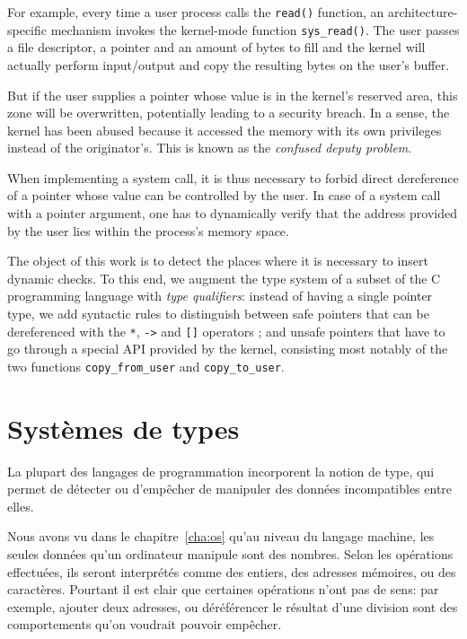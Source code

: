 For example, every time a user process calls the \texttt{read()} function, an
architecture-specific mechanism invokes the kernel-mode function
\texttt{sys\_read()}. The user passes a file descriptor, a pointer and an amount
of bytes to fill and the kernel will actually perform input/output and copy the
resulting bytes on the user's buffer.

But if the user supplies a pointer whose value is in the kernel's reserved area,
this zone will be overwritten, potentially leading to a security breach. In a
sense, the kernel has been abused because it accessed the memory with its own
privileges instead of the originator's. This is known as the \emph{confused
deputy problem}\cite{hardy88confused}.

When implementing a system call, it is thus necessary to forbid direct
dereference of a pointer whose value can be controlled by the user. In case of a
system call with a pointer argument, one has to dynamically verify that the
address provided by the user lies within the process's memory space.


The object of this work is to detect the places where it is necessary to insert
dynamic checks. To this end, we augment the type system of a subset of the C
programming language with \emph{type qualifiers}: instead of having a single
pointer type, we add syntactic rules to distinguish between safe pointers that
can be dereferenced with the \texttt{*}, \texttt{->} and \texttt{[]} operators ;
and unsafe pointers that have to go through a special API provided by the
kernel, consisting most notably of the two functions \texttt{copy\_from\_user}
and \texttt{copy\_to\_user}.

\section{Systèmes de types}

La plupart des langages de programmation incorporent la notion de type, qui
permet de détecter ou d'empêcher de manipuler des données incompatibles entre
elles.

Nous avons vu dans le chapitre~\ref{cha:os} qu'au niveau du langage machine, les
seules données qu'un ordinateur manipule sont des nombres. Selon les opérations
effectuées, ils seront interprétés comme des entiers, des adresses mémoires, ou
des caractères. Pourtant il est clair que certaines opérations n'ont pas de
sens: par exemple, ajouter deux adresses, ou déréférencer le résultat d'une
division sont des comportements qu'on voudrait pouvoir empêcher.

